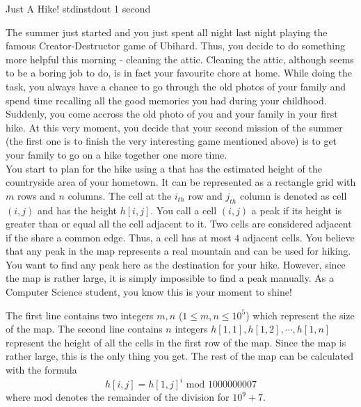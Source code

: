 
\begin{problem}{Just A Hike!}
{stdin}{stdout}
{1 second}{}{}

The summer just started and you just spent all night last night playing the famous Creator-Destructor game of Ubihard. 
Thus, you decide to do something more helpful this morning - cleaning the attic. Cleaning the attic, although seems to be
a boring job to do, is in fact your favourite chore at home. While doing the task, you always have a chance to go through 
the old photos of your family and spend time recalling all the good memories you had during your childhood. Suddenly, you 
come accross the old photo of you and your family in your first hike. At this very moment, you decide that your second
mission of the summer (the first one is to finish the very interesting game mentioned above) is to get your family to go
on a hike together one more time.\\

You start to plan for the hike using a that has the estimated height of the countryside area of your hometown. It can be 
represented as a rectangle grid with $m$ rows and $n$ columns. The cell at the $i_{th}$ row and $j_{th}$ column is denoted 
as cell $(i, j)$ and has the height $h[i, j]$. You call a cell $(i, j)$ a peak if its height is greater than or equal all 
the cell adjacent to it. Two cells are considered adjacent if the share a common edge. Thus, a cell has at most $4$ adjacent 
cells. You believe that any peak in the map represents a real mountain and can be used for hiking. You want to find any peak 
here as the destination for your hike. However, since the map is rather large, it is simply impossible to find a peak manually.
As a Computer Science student, you know this is your moment to shine!

\InputFile

The first line contains two integers $m, n$ ($1 \leq m, n \leq 10^5$) which represent the size of the map. The second line
contains $n$ integers $h[1, 1], h[1, 2], \cdots, h[1, n]$ represent the height of all the cells in the first row of the
map. Since the map is rather large, this is the only thing you get. The rest of the map can be calculated with the formula
    \begin{equation}
       h[i, j] = h[1, j]^i \text{ mod } 1000000007
    \end{equation}
where mod denotes the remainder of the division for $10^9 + 7$.


\end{problem}
